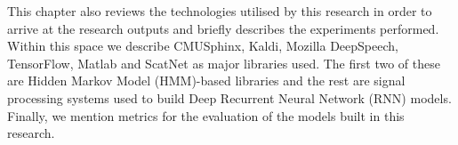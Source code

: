 This chapter also reviews the technologies utilised by this research in order to arrive at the research outputs and briefly describes the experiments performed.  Within this space we describe CMUSphinx, Kaldi, Mozilla DeepSpeech, TensorFlow, Matlab and ScatNet as major libraries used.   The first two of these are Hidden Markov Model (HMM)-based libraries and the rest are  signal processing systems used to build Deep Recurrent Neural Network (RNN) models. Finally, we mention metrics for the evaluation of the models built in this research.
